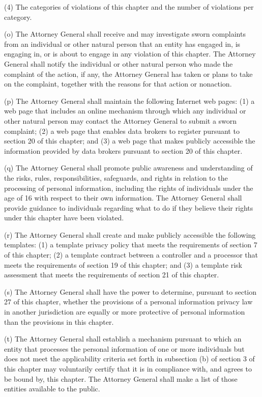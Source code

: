 (4) The categories of violations of this chapter and the number of violations per category.

(o) The Attorney General shall receive and may investigate sworn complaints from an individual or other natural person that an entity has engaged in, is engaging in, or is about to engage in any violation of this chapter. The Attorney General shall notify the individual or other natural person who made the complaint of the action, if any, the Attorney General has taken or plans to take on the complaint, together with the reasons for that action or nonaction.

(p) The Attorney General shall maintain the following Internet web pages: (1) a web page that includes an online mechanism through which any individual or other natural person may contact the Attorney General to submit a sworn complaint; (2) a web page that enables data brokers to register pursuant to section 20 of this chapter; and (3) a web page that makes publicly accessible the information provided by data brokers pursuant to section 20 of this chapter.

(q) The Attorney General shall promote public awareness and understanding of the risks, rules, responsibilities, safeguards, and rights in relation to the processing of personal information, including the rights of individuals under the age of 16 with respect to their own information. The Attorney General shall provide guidance to individuals regarding what to do if they believe their rights under this chapter have been violated.

(r) The Attorney General shall create and make publicly accessible the following templates: (1) a template privacy policy that meets the requirements of section 7 of this chapter; (2) a template contract between a controller and a processor that meets the requirements of section 19 of this chapter; and (3) a template risk assessment that meets the requirements of section 21 of this chapter.

(s) The Attorney General shall have the power to determine, pursuant to section 27 of this chapter, whether the provisions of a personal information privacy law in another jurisdiction are equally or more protective of personal information than the provisions in this chapter.

(t) The Attorney General shall establish a mechanism pursuant to which an entity that processes the personal information of one or more individuals but does not meet the applicability criteria set forth in subsection (b) of section 3 of this chapter may voluntarily certify that it is in compliance with, and agrees to be bound by, this chapter. The Attorney General shall make a list of those entities available to the public. 

